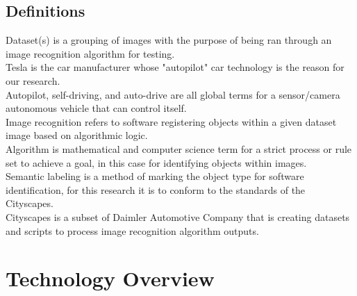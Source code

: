 \subsection{Definitions}
Dataset(s) is a grouping of images with the purpose of being ran through an image recognition algorithm for testing.\\
Tesla is the car manufacturer whose "autopilot" car technology is the reason for our research.\\
Autopilot, self-driving, and auto-drive are all global terms for a sensor/camera autonomous vehicle that can control itself.\\
Image recognition refers to software registering objects within a given dataset image based on algorithmic logic. \\
Algorithm is mathematical and computer science term for a strict process or rule set to achieve a goal, in this case for identifying objects within images.\\
Semantic labeling is a method of marking the object type for software identification, for this research it is to conform to the standards of the Cityscapes.\\
Cityscapes is a subset of Daimler Automotive Company that is creating datasets and scripts to process image recognition algorithm outputs.

\section{Technology Overview}
